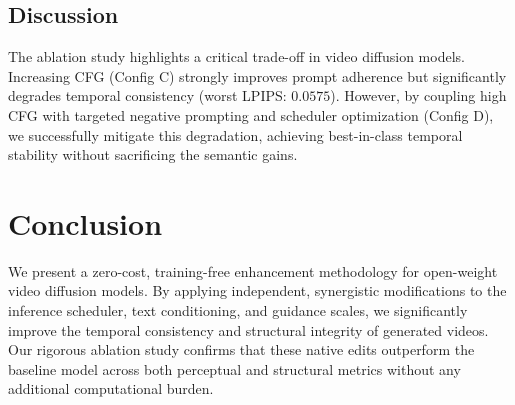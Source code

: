 \documentclass[10pt, conference]{IEEEtran}
\begin{document}
\subsection{Discussion}
The ablation study highlights a critical trade-off in video diffusion models. Increasing CFG (Config C) strongly improves prompt adherence but significantly degrades temporal consistency (worst LPIPS: $0.0575$). However, by coupling high CFG with targeted negative prompting and scheduler optimization (Config D), we successfully mitigate this degradation, achieving best-in-class temporal stability without sacrificing the semantic gains.

\section{Conclusion}
We present a zero-cost, training-free enhancement methodology for open-weight video diffusion models. By applying independent, synergistic modifications to the inference scheduler, text conditioning, and guidance scales, we significantly improve the temporal consistency and structural integrity of generated videos. Our rigorous ablation study confirms that these native edits outperform the baseline model across both perceptual and structural metrics without any additional computational burden. 
\end{document}
